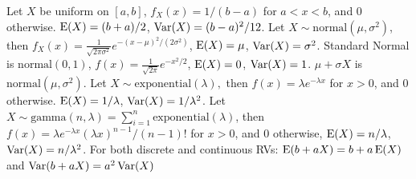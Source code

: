  Let $X$ be uniform on $[a,b]$, $f_X(x) = 1/(b-a)$ for $a < x < b$, and 0 otherwise. $\operatorname{E}(X) = (b+a)/2$, $\operatorname{Var}(X) = (b-a)^2/12$.
 Let $X \sim \mathrm{normal}(\mu, \sigma^2)$, then $f_X(x) = \frac{1}{\sqrt{2\pi\sigma^2}}e^{-(x-\mu)^2/(2\sigma^2)}$, $\operatorname{E}(X) = \mu$, $\operatorname{Var}(X) = \sigma^2$.
 Standard Normal is $\mathrm{normal}(0,1)$, $f(x) = \frac{1}{\sqrt{2\pi}}e^{-x^2/2}$, $\operatorname{E}(X) = 0$, $\operatorname{Var}(X) = 1$. $\mu + \sigma X$ is $\mathrm{normal}(\mu, \sigma^2)$.
 Let $X \sim \mathrm{exponential}(\lambda),$ then $f(x) = \lambda e^{-\lambda x}$ for $x > 0$, and $0$ otherwise. $\operatorname{E}(X) = 1/\lambda$, $\operatorname{Var}(X) = 1/\lambda^2$.
 Let $X \sim \mathrm{gamma}(n,\lambda) = \sum^n_{i=1} \mathrm{exponential}(\lambda)$, then $f(x) = \lambda e^{-\lambda x}(\lambda x)^{n-1}/(n-1)!$ for $x > 0$, and 0 otherwise, $\operatorname{E}(X) =n/\lambda$, $\operatorname{Var}(X) = n/\lambda^2$.
 For both discrete and continuous RVs: $\operatorname{E}(b + aX) = b+a\operatorname{E}(X)$ and $\operatorname{Var}(b+aX) = a^2\operatorname{Var}(X)$